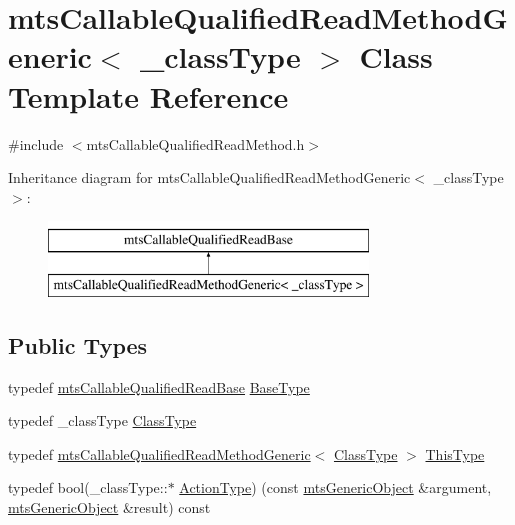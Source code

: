 \hypertarget{classmts_callable_qualified_read_method_generic}{}\section{mts\+Callable\+Qualified\+Read\+Method\+Generic$<$ \+\_\+class\+Type $>$ Class Template Reference}
\label{classmts_callable_qualified_read_method_generic}


{\ttfamily \#include $<$mts\+Callable\+Qualified\+Read\+Method.\+h$>$}

Inheritance diagram for mts\+Callable\+Qualified\+Read\+Method\+Generic$<$ \+\_\+class\+Type $>$\+:\begin{figure}[H]
\begin{center}
\leavevmode
\includegraphics[height=2.000000cm]{d3/d9d/classmts_callable_qualified_read_method_generic}
\end{center}
\end{figure}
\subsection*{Public Types}
\begin{DoxyCompactItemize}
\item 
typedef \hyperlink{classmts_callable_qualified_read_base}{mts\+Callable\+Qualified\+Read\+Base} \hyperlink{classmts_callable_qualified_read_method_generic_a773d5a3d8a4847835a36aa9ccfb93774}{Base\+Type}
\item 
typedef \+\_\+class\+Type \hyperlink{classmts_callable_qualified_read_method_generic_ada2d394b00a2db849dd5d67b965fd63b}{Class\+Type}
\item 
typedef \hyperlink{classmts_callable_qualified_read_method_generic}{mts\+Callable\+Qualified\+Read\+Method\+Generic}$<$ \hyperlink{classmts_callable_qualified_read_method_generic_ada2d394b00a2db849dd5d67b965fd63b}{Class\+Type} $>$ \hyperlink{classmts_callable_qualified_read_method_generic_ae4d162ce942aeab0d486d2aa8f001a39}{This\+Type}
\item 
typedef bool(\+\_\+class\+Type\+::$\ast$ \hyperlink{classmts_callable_qualified_read_method_generic_afe3373d95d9a97f9737078e041f945d8}{Action\+Type}) (const \hyperlink{classmts_generic_object}{mts\+Generic\+Object} \&argument, \hyperlink{classmts_generic_object}{mts\+Generic\+Object} \&result) const 
\end{DoxyCompactItemize}
